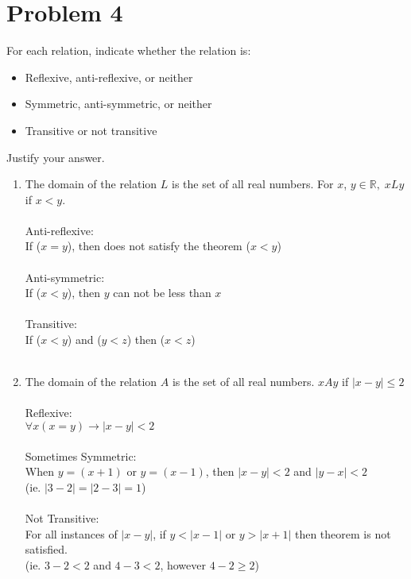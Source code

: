 \documentclass{amsart}
\theoremstyle{definition}
\theoremstyle{Exercise}
\theoremstyle{remark}
\theoremstyle{rule}
\numberwithin{equation}{section}
\newcommand{\Real}{\mathbb R}
\begin{document}
\vspace*{0.25in}
\section*{Problem 4}

For each relation, indicate whether the relation is:
\begin{itemize}
  \item Reflexive, anti-reflexive, or neither
  \item Symmetric, anti-symmetric, or neither
  \item Transitive or not transitive
\end{itemize}
Justify your answer.\\
\begin{enumerate}[label=(\alph*)]
\item The domain of the relation $L$ is the set of all real numbers. For $x$, $y \in \Real, \; xLy$ if $x < y$.\\\\
Anti-reflexive:\\
If ($x = y$), then does not satisfy the theorem ($x < y$)\\\\

Anti-symmetric:\\
If ($x<y$), then $y$ can not be less than $x$\\\\

Transitive:\\
If ($x<y$) and ($y<z$) then ($x<z$)
\\\\

\item The domain of the relation $A$ is the set of all real numbers. $xAy$ if $|x-y| \leq 2$\\\\
Reflexive:\\
$\forall x (x=y) \rightarrow |x-y| < 2$\\\\

Sometimes Symmetric:\\
When $y=(x+1)$ or $y=(x-1)$, then $|x-y|<2$ and $|y-x|<2$\\
(ie. $|3-2| = |2-3| = 1$)\\\\

Not Transitive:\\
For all instances of $|x-y|$, if $y<|x-1|$ or $y>|x+1|$ then theorem is not satisfied.\\
(ie. $3-2 < 2$ and $4-3 < 2$, however $4-2 \geq 2$)
\\\\


\end{enumerate}
\end{document}

